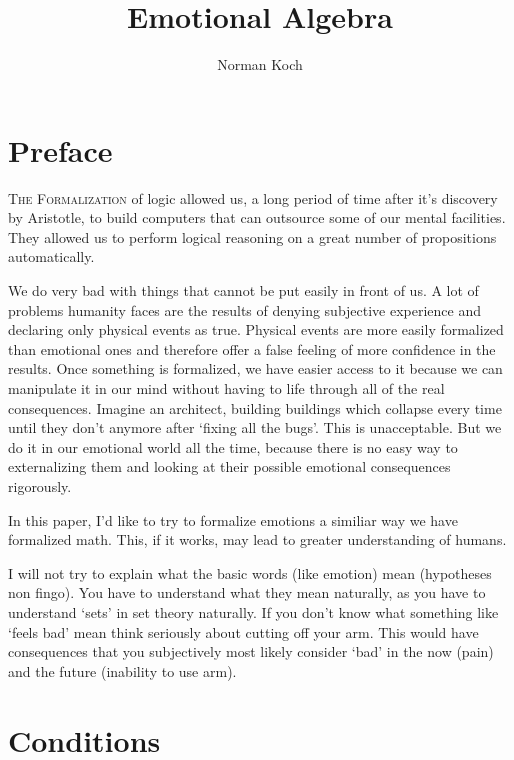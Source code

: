 \documentclass{scrartcl}
\begin{document}
\author{Norman Koch}
\title{Emotional Algebra}

\maketitle

\tableofcontents
\newpage

\section{Preface}

\lettrine[nindent=0em]{\color{purple}T}{he Formalization}
of logic allowed us, a long period of time after it's discovery by Aristotle, to build computers that can outsource some of our
mental facilities. They allowed us to perform logical reasoning on a great number of propositions automatically.

We do very bad with things that cannot be put easily in front of us. A lot of problems humanity faces are the results of
denying subjective experience and declaring only physical events as true. Physical events are more easily formalized than
emotional ones and therefore offer a false feeling of more confidence in the results. Once something is formalized, we have
easier access to it because we can manipulate it in our mind without having to life through all of the real consequences.
Imagine an architect, building buildings which collapse every time until they don't anymore after `fixing all the bugs'.
This is unacceptable. But we do it in our emotional world all the time, because there is no easy way to externalizing them
and looking at their possible emotional consequences rigorously.

In this paper, I'd like to try to formalize emotions a similiar way we have formalized math. This, if it works, may 
lead to greater understanding of humans.

I will not try to explain what the basic words (like emotion) mean (\frq hypotheses non fingo\flq). You have to understand what they mean 
naturally, as you have to understand `sets' in set theory naturally. If you don't know what something like `feels bad' mean
think seriously about cutting off your arm. This would have consequences that you subjectively most likely consider
`bad' in the now (pain) and the future (inability to use arm).

\section{Conditions}
\end{document}
